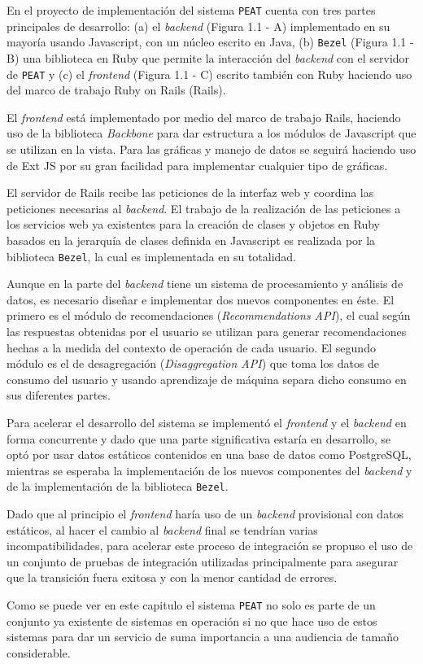 En el proyecto de implementación del sistema \texttt{PEAT}
cuenta con tres partes principales de desarrollo:
(a) el \textit{backend} (Figura 1.1 - A) implementado en su mayoría usando
Javascript, con un núcleo escrito en Java, (b) \texttt{Bezel} (Figura 1.1 - B)
una biblioteca en Ruby que permite la interacción del \textit{backend}
con el servidor de \texttt{PEAT} y (c) el \textit{frontend} (Figura 1.1 - C) escrito
también con Ruby haciendo uso del marco de trabajo Ruby on Rails (Rails).


El \textit{frontend} está implementado por medio del marco de trabajo
Rails, haciendo uso de la biblioteca \textit{Backbone}
para dar estructura a los módulos de Javascript que se utilizan en la vista.
Para las gráficas y manejo de datos se seguirá haciendo uso de Ext JS
por su gran facilidad para implementar cualquier tipo de gráficas.

El servidor de Rails recibe las peticiones de la interfaz web y
coordina las peticiones necesarias al \textit{backend}. El trabajo
de la realización de las peticiones a los servicios web ya existentes para la
creación de clases y objetos en Ruby basados en la jerarquía de clases
definida en Javascript es realizada por la biblioteca \texttt{Bezel},
la cual es implementada en su totalidad.

Aunque en la parte del \textit{backend} tiene un sistema de procesamiento
y análisis de datos, es necesario diseñar e implementar dos nuevos componentes
en éste. El primero es el módulo de recomendaciones (\textit{Recommendations API}),
el cual según las respuestas obtenidas por el usuario se utilizan para generar
recomendaciones hechas a la medida del contexto de operación de cada usuario.
El segundo módulo es el de desagregación (\textit{Disaggregation API}) que toma los
datos de consumo del usuario y usando aprendizaje de máquina separa dicho consumo
en sus diferentes partes.

Para acelerar el desarrollo del sistema se implementó el \textit{frontend}
y el \textit{backend} en forma concurrente y dado que una parte significativa
estaría en desarrollo, se optó por usar datos estáticos contenidos
en una base de datos como PostgreSQL, mientras se esperaba la implementación
de los nuevos componentes del \textit{backend} y de la implementación de la
biblioteca \texttt{Bezel}.

Dado que al principio el \textit{frontend} haría uso de un \textit{backend}
provisional con datos estáticos, al hacer el cambio al \textit{backend} final
se tendrían varias incompatibilidades, para acelerar este proceso de integración
se propuso el uso de un conjunto de pruebas de integración utilizadas
principalmente para asegurar que la transición fuera exitosa y con la menor
cantidad de errores.

Como se puede ver en este capitulo el sistema \texttt{PEAT} no solo es parte de
un conjunto ya existente de sistemas en operación si no que hace uso de estos
sistemas para dar un servicio de suma importancia a una audiencia de tamaño
considerable.

